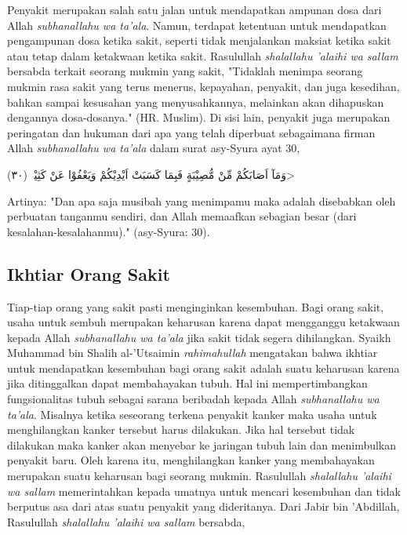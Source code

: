     Penyakit merupakan salah satu jalan untuk mendapatkan ampunan dosa dari Allah \textit{subhanallahu wa ta'ala}. Namun, terdapat ketentuan untuk mendapatkan pengampunan dosa ketika sakit, seperti tidak menjalankan maksiat ketika sakit atau tetap dalam ketakwaan ketika sakit. Rasulullah \textit{shalallahu 'alaihi wa sallam} bersabda terkait seorang mukmin yang sakit, "Tidaklah menimpa seorang mukmin rasa sakit yang terus menerus, kepayahan, penyakit, dan juga kesedihan, bahkan sampai kesusahan yang menyusahkannya, melainkan akan dihapuskan dengannya dosa-dosanya." (HR. Muslim). Di sisi lain, penyakit juga merupakan peringatan dan hukuman dari apa yang telah diperbuat sebagaimana firman Allah \textit{subhanallahu wa ta'ala} dalam surat asy-Syura ayat 30,

    \begin{flushright}
        \<وَمَآ اَصَابَكُمْ مِّنْ مُّصِيْبَةٍ فَبِمَا كَسَبَتْ اَيْدِيْكُمْ وَيَعْفُوْا عَنْ كَثِيْرٍۗ (٣٠)>
    \end{flushright}

    Artinya: "Dan apa saja musibah yang menimpamu maka adalah disebabkan oleh perbuatan tanganmu sendiri, dan Allah memaafkan sebagian besar (dari kesalahan-kesalahanmu)." (asy-Syura: 30).

    \subsection{Ikhtiar Orang Sakit}
    Tiap-tiap orang yang sakit pasti menginginkan kesembuhan. Bagi orang sakit, usaha untuk sembuh merupakan keharusan karena dapat mengganggu ketakwaan kepada Allah \textit{subhanallahu wa ta'ala} jika sakit tidak segera dihilangkan. Syaikh Muhammad bin Shalih al-'Utsaimin \textit{rahimahullah} mengatakan bahwa ikhtiar untuk mendapatkan kesembuhan bagi orang sakit adalah suatu keharusan karena jika ditinggalkan dapat membahayakan tubuh. Hal ini mempertimbangkan fungsionalitas tubuh sebagai sarana beribadah kepada Allah \textit{subhanallahu wa ta'ala}. Misalnya ketika seseorang terkena penyakit kanker maka usaha untuk menghilangkan kanker tersebut harus dilakukan. Jika hal tersebut tidak dilakukan maka kanker akan menyebar ke jaringan tubuh lain dan menimbulkan penyakit baru. Oleh karena itu, menghilangkan kanker yang membahayakan merupakan suatu keharusan bagi seorang mukmin. Rasulullah \textit{shalallahu 'alaihi wa sallam} memerintahkan kepada umatnya untuk mencari kesembuhan dan tidak berputus asa dari atas suatu penyakit yang dideritanya. Dari Jabir bin 'Abdillah, Rasulullah \textit{shalallahu 'alaihi wa sallam} bersabda,

